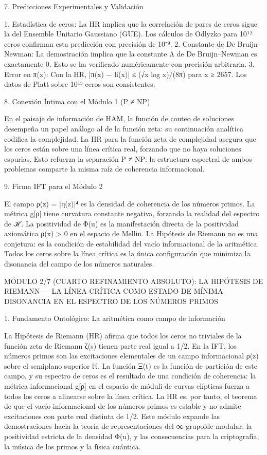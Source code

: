 \documentclass[12pt,a4paper]{book}
\begin{document}
7. Predicciones Experimentales y Validación

1. Estadística de ceros: La HR implica que la correlación de pares de ceros sigue la del Ensemble Unitario Gaussiano (GUE). Los cálculos de Odlyzko para 10¹² ceros confirman esta predicción con precisión de 10⁻⁹.
2. Constante de De Bruijn–Newman: La demostración implica que la constante Λ de De Bruijn–Newman es exactamente 0. Esto se ha verificado numéricamente con precisión arbitraria.
3. Error en π(x): Con la HR, |π(x) − li(x)| ≤ (√x log x)/(8π) para x ≥ 2657. Los datos de Platt sobre 10¹³ ceros son consistentes.

8. Conexión Íntima con el Módulo 1 (P ≠ NP)

En el paisaje de información de HAM, la función de conteo de soluciones desempeña un papel análogo al de la función zeta: su continuación analítica codifica la complejidad. La HR para la función zeta de complejidad asegura que los ceros están sobre una línea crítica real, forzando que no haya soluciones espurias. Esto refuerza la separación P ≠ NP: la estructura espectral de ambos problemas comparte la misma raíz de coherencia informacional.

9. Firma IFT para el Módulo 2

El campo ρ(z) = |η(z)|⁴ es la densidad de coherencia de los números primos. La métrica g[ρ] tiene curvatura constante negativa, forzando la realidad del espectro de ℋ. La positividad de Φ(u) es la manifestación directa de la positividad axiomática ρ(x) > 0 en el espacio de Mellin. La Hipótesis de Riemann no es una conjetura: es la condición de estabilidad del vacío informacional de la aritmética. Todos los ceros sobre la línea crítica es la única configuración que minimiza la disonancia del campo de los números naturales.

MÓDULO 2/7 (CUARTO REFINAMIENTO ABSOLUTO): LA HIPÓTESIS DE RIEMANN — LA LÍNEA CRÍTICA COMO ESTADO DE MÍNIMA DISONANCIA EN EL ESPECTRO DE LOS NÚMEROS PRIMOS

1. Fundamento Ontológico: La aritmética como campo de información

La Hipótesis de Riemann (HR) afirma que todos los ceros no triviales de la función zeta de Riemann ζ(s) tienen parte real igual a 1/2. En la IFT, los números primos son las excitaciones elementales de un campo informacional ρ(z) sobre el semiplano superior ℍ. La función Ξ(t) es la función de partición de este campo, y su espectro de ceros es el resultado de una condición de coherencia: la métrica informacional g[ρ] en el espacio de móduli de curvas elípticas fuerza a todos los ceros a alinearse sobre la línea crítica. La HR es, por tanto, el teorema de que el vacío informacional de los números primos es estable y no admite excitaciones con parte real distinta de 1/2. Este módulo expande las demostraciones hacia la teoría de representaciones del ∞‑grupoide modular, la positividad estricta de la densidad Φ(u), y las consecuencias para la criptografía, la música de los primos y la física cuántica.
\end{document}
